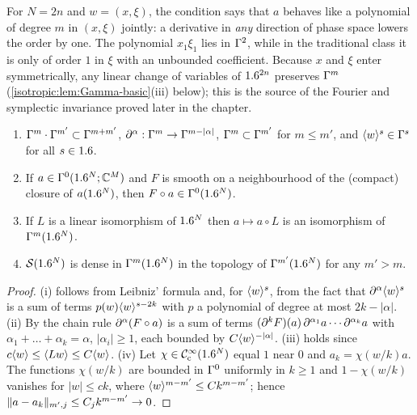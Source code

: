 \begin{discussion}
For $N=2n$ and $w=(x,\xi)$, the condition says that $a$ behaves like a
polynomial of degree $m$ in $(x,\xi)$ jointly: a derivative in \emph{any}
direction of phase space lowers the order by one. The polynomial
$x_1\xi_1$ lies in $\Gamma^{2}$, while in the traditional class it is only of
order $1$ in $\xi$ with an unbounded coefficient. Because $x$ and $\xi$
enter symmetrically, any linear change of variables of $1.6^{2n}$ preserves
$\Gamma^{m}$ (\cref{isotropic:lem:Gamma-basic}(iii) below); this is the source
of the Fourier and symplectic invariance proved later in the chapter.
\end{discussion}

\begin{lemma}\label{isotropic:lem:Gamma-basic}
\begin{enumerate}[label=\textup{(\roman*)}]
\item $\Gamma^{m}\cdot\Gamma^{m'}\subset\Gamma^{m+m'}$, $\partial^\alpha:\Gamma^{m}\to\Gamma^{m-|\alpha|}$,
  $\Gamma^{m}\subset\Gamma^{m'}$ for $m\le m'$, and $\langle w\rangle^s\in\Gamma^{s}$ for all $s\in1.6$.
\item If $a\in\Gamma^{0}(1.6^N;\mathbb{C}^M)$ and $F$ is smooth on a neighbourhood of the
  (compact) closure of $a(1.6^N)$, then $F\circ a\in\Gamma^{0}(1.6^N)$.
\item If $L$ is a linear isomorphism of $1.6^N$ then $a\mapsto a\circ L$ is an
  isomorphism of $\Gamma^{m}(1.6^N)$.
\item $\mathcal{S}(1.6^N)$ is dense in $\Gamma^{m}(1.6^N)$ in the topology of $\Gamma^{m'}(1.6^N)$
  for any $m'>m$.
\end{enumerate}
\end{lemma}
\begin{proof}
(i) follows from Leibniz' formula and, for $\langle w\rangle^s$, from the fact that
$\partial^\alpha\langle w\rangle^s$ is a sum of terms $p(w)\langle w\rangle^{s-2k}$ with $p$ a
polynomial of degree at most $2k-|\alpha|$. (ii) By the chain rule
$\partial^\alpha(F\circ a)$ is a sum of terms
$(\partial^kF)(a)\,\partial^{\alpha_1}a\cdots\partial^{\alpha_k}a$ with
$\alpha_1+\dots+\alpha_k=\alpha$, $|\alpha_i|\ge1$, each bounded by
$C\langle w\rangle^{-|\alpha|}$. (iii) holds since $c\langle w\rangle\le\langle Lw\rangle\le C\langle w\rangle$.
(iv) Let $\chi\in\mathcal{C}^\infty_{\mathrm{c}}(1.6^N)$ equal $1$ near $0$ and $a_k=\chi(w/k)a$. The
functions $\chi(w/k)$ are bounded in $\Gamma^{0}$ uniformly in $k\ge1$ and
$1-\chi(w/k)$ vanishes for $|w|\le ck$, where
$\langle w\rangle^{m-m'}\le Ck^{m-m'}$; hence $\lVert a-a_k\rVert_{m',j}\le C_jk^{m-m'}\to0$.
\end{proof}

